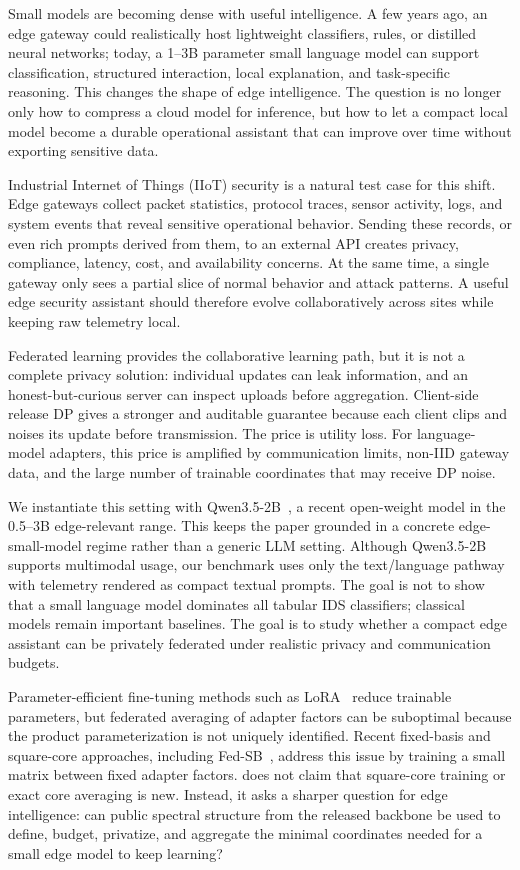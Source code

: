 Small models are becoming dense with useful intelligence. A few years ago, an edge gateway could realistically host lightweight classifiers, rules, or distilled neural networks; today, a 1--3B parameter small language model can support classification, structured interaction, local explanation, and task-specific reasoning. This changes the shape of edge intelligence. The question is no longer only how to compress a cloud model for inference, but how to let a compact local model become a durable operational assistant that can improve over time without exporting sensitive data.

Industrial Internet of Things (IIoT) security is a natural test case for this shift. Edge gateways collect packet statistics, protocol traces, sensor activity, logs, and system events that reveal sensitive operational behavior. Sending these records, or even rich prompts derived from them, to an external API creates privacy, compliance, latency, cost, and availability concerns. At the same time, a single gateway only sees a partial slice of normal behavior and attack patterns. A useful edge security assistant should therefore evolve collaboratively across sites while keeping raw telemetry local.

Federated learning provides the collaborative learning path, but it is not a complete privacy solution: individual updates can leak information, and an honest-but-curious server can inspect uploads before aggregation. Client-side release DP gives a stronger and auditable guarantee because each client clips and noises its update before transmission. The price is utility loss. For language-model adapters, this price is amplified by communication limits, non-IID gateway data, and the large number of trainable coordinates that may receive DP noise.

We instantiate this setting with Qwen3.5-2B~\citep{qwen35modelcard}, a recent open-weight model in the 0.5--3B edge-relevant range. This keeps the paper grounded in a concrete edge-small-model regime rather than a generic LLM setting. Although Qwen3.5-2B supports multimodal usage, our benchmark uses only the text/language pathway with telemetry rendered as compact textual prompts. The goal is not to show that a small language model dominates all tabular IDS classifiers; classical models remain important baselines. The goal is to study whether a compact edge assistant can be privately federated under realistic privacy and communication budgets.

Parameter-efficient fine-tuning methods such as LoRA~\citep{hu2021lora} reduce trainable parameters, but federated averaging of adapter factors can be suboptimal because the product parameterization is not uniquely identified. Recent fixed-basis and square-core approaches, including Fed-SB~\citep{singhal2025fedsb}, address this issue by training a small matrix between fixed adapter factors. \method does not claim that square-core training or exact core averaging is new. Instead, it asks a sharper question for edge intelligence: can public spectral structure from the released backbone be used to define, budget, privatize, and aggregate the minimal coordinates needed for a small edge model to keep learning?


